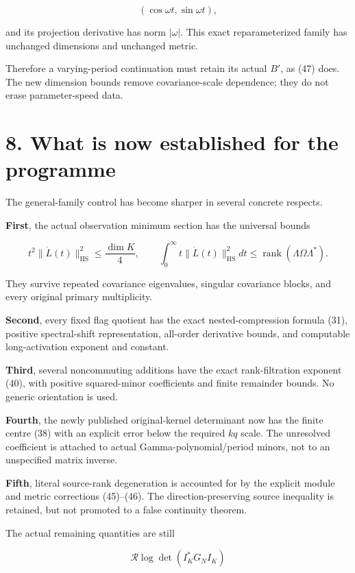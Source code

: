 \documentclass[11pt]{article}
\begin{document}
\[
(\cos\omega t,\sin\omega t),
\]

and its projection derivative has norm \(|\omega|\). This exact reparameterized family has unchanged dimensions and unchanged metric.

Therefore a varying-period continuation must retain its actual \(B'\), as (47) does. The new dimension bounds remove covariance-scale dependence; they do not erase parameter-speed data.

\section{8. What is now established for the programme}\label{what-is-now-established-for-the-programme}

The general-family control has become sharper in several concrete respects.

\textbf{First}, the actual observation minimum section has the universal bounds

\[
t^2\|\dot L(t)\|_{\mathrm{HS}}^2\le\frac{\dim K}{4},
\qquad
\int_0^\infty t\|\dot L(t)\|_{\mathrm{HS}}^2dt
\le\operatorname{rank}(\Lambda\Omega\Lambda^*).
\]

They survive repeated covariance eigenvalues, singular covariance blocks, and every original primary multiplicity.

\textbf{Second}, every fixed flag quotient has the exact nested-compression formula (31), positive spectral-shift representation, all-order derivative bounds, and computable long-activation exponent and constant.

\textbf{Third}, several noncommuting additions have the exact rank-filtration exponent (40), with positive squared-minor coefficients and finite remainder bounds. No generic orientation is used.

\textbf{Fourth}, the newly published original-kernel determinant now has the finite centre (38) with an explicit error below the required \(kq\) scale. The unresolved coefficient is attached to actual Gamma-polynomial/period minors, not to an unspecified matrix inverse.

\textbf{Fifth}, literal source-rank degeneration is accounted for by the explicit module and metric corrections (45)--(46). The direction-preserving source inequality is retained, but not promoted to a false continuity theorem.

The actual remaining quantities are still

\[
\mathcal R\log\det(I_K^*G_NI_K)
\]
\end{document}
